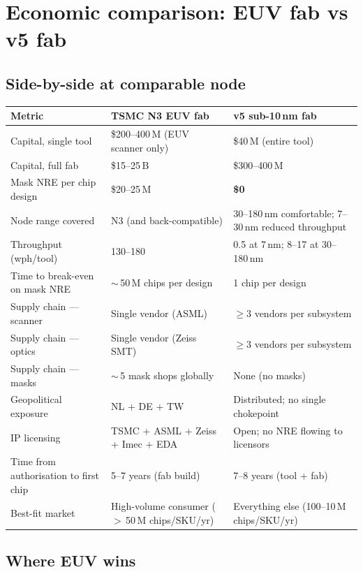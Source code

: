 \documentclass[11pt,letterpaper]{article}
\begin{document}
\section{Economic comparison: EUV fab vs v5 fab}

\subsection{Side-by-side at comparable node}

\begin{center}
\small
\begin{tabular}{p{}p{}p{}}
\toprule
Metric & TSMC N3 EUV fab & v5 sub-10\,nm fab \\
\midrule
Capital, single tool & \$200--400\,M (EUV scanner only) & \$40\,M (entire tool) \\
Capital, full fab & \$15--25\,B & \$300--400\,M \\
Mask NRE per chip design & \$20--25\,M & \textbf{\$0} \\
Node range covered & N3 (and back-compatible) & 30--180\,nm comfortable; 7--30\,nm reduced throughput \\
Throughput (wph/tool) & 130--180 & 0.5 at 7\,nm; 8--17 at 30--180\,nm \\
Time to break-even on mask NRE & $\sim$\,50\,M chips per design & 1 chip per design \\
Supply chain --- scanner & Single vendor (ASML) & $\geq 3$ vendors per subsystem \\
Supply chain --- optics & Single vendor (Zeiss SMT) & $\geq 3$ vendors per subsystem \\
Supply chain --- masks & $\sim$\,5 mask shops globally & None (no masks) \\
Geopolitical exposure & NL + DE + TW & Distributed; no single chokepoint \\
IP licensing & TSMC + ASML + Zeiss + Imec + EDA & Open; no NRE flowing to licensors \\
Time from authorisation to first chip & 5--7 years (fab build) & 7--8 years (tool + fab) \\
Best-fit market & High-volume consumer ($>$\,50\,M chips/SKU/yr) & Everything else (100--10\,M chips/SKU/yr) \\
\bottomrule
\end{tabular}
\end{center}

\subsection{Where EUV wins}
\end{document}

